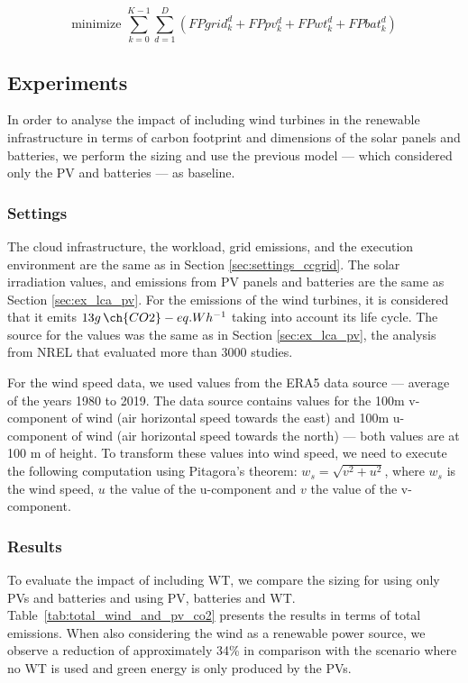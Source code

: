 \begin{equation} \label{eq:new_obj_co2_wt}
  \text{minimize }\sum_{k=0}^{K-1} \sum_{d=1}^D (FPgrid^d_k +  FPpv^d_k +  FPwt^d_k + FPbat^d_k) 
\end{equation}

\subsection{Experiments}

In order to analyse the impact of including wind turbines in the renewable infrastructure in terms of carbon footprint and dimensions of the solar panels and batteries, we perform the sizing and use the previous model --- which considered only the PV and batteries --- as baseline. 

\subsubsection{Settings}
\label{sec:settings_wt}

The cloud infrastructure, the workload, grid emissions, and the execution environment are the same as in Section \ref{sec:settings_ccgrid}. The solar irradiation values, and emissions from PV panels and batteries are the same as Section \ref{sec:ex_lca_pv}. For the  emissions of the wind turbines, it is considered that it emits $13 g\,\ch{CO2}-eq.Wh^{-1}$ taking into account its life cycle. The source for the values was the same as in Section \ref{sec:ex_lca_pv}, the analysis from NREL that evaluated more than 3000 studies.

For the wind speed data, we used values from the ERA5 data source \cite{era5_wind_2022} --- average of the years 1980 to 2019. The data source contains values for the 100m v-component of wind (air horizontal speed towards the east) and 100m u-component of wind (air horizontal speed towards the north) --- both values are at 100 m of height. To transform these values into wind speed, we need to execute the following computation using Pitagora's theorem: $ w_s = \sqrt{ v^2 + u^2} $, where $w_s$ is the wind speed, $u$ the value of the u-component and $v$ the value of the v-component.

\subsubsection{Results}
\label{sec:results_wt}

To evaluate the impact of including WT, we compare the sizing for using only PVs and batteries and using PV, batteries and WT. Table~\ref{tab:total_wind_and_pv_co2} presents the results in terms of total emissions. When also considering the wind as a renewable power source, we observe a reduction of approximately 34\% in comparison with the scenario where no WT is used and green energy is only produced by the PVs.

